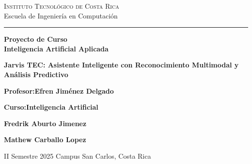 
\begin{titlepage}

\begin{center}
{\scshape \Large
Instituto Tecnológico de Costa Rica\\
}
\vspace{4mm}
{\Large
Escuela de Ingeniería en Computación
}
\vspace{8mm}
\hrule
\vspace{4mm}
\begin{spacing}{1.8}
{\large\textbf{
Proyecto  de Curso\\
Inteligencia Artificial Aplicada
}}
\end{spacing}
\vspace{42mm}

\begin{spacing}{2.0}
{\Large \bf Jarvis TEC: Asistente Inteligente con Reconocimiento Multimodal y Análisis Predictivo}\\
\end{spacing}
\end{center}

\vfill
\noindent
\begin{minipage}[t]{0.5\textwidth}
\large
\textbf{Profesor:Efren Jiménez Delgado}

 \vspace{5mm}
\textbf{Curso:Inteligencia Artificial}
\end{minipage}
\hfill
\begin{minipage}[t]{0.5\textwidth}\raggedleft
\large
\textbf{Fredrik  Aburto Jimenez}

\textbf{Mathew Carballo Lopez}

\end{minipage}

\vspace{24mm}

\begin{center}
\large II Semestre 2025
Campus San Carlos, Costa Rica
\end{center}

\end{titlepage}
\restoregeometry